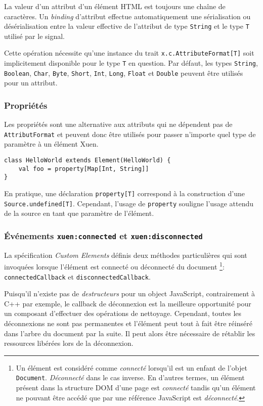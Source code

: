 La valeur d'un attribut d'un élément HTML est toujours une chaîne de caractères. Un \emph{binding} d'attribut effectue automatiquement une sérialisation ou désérialisation entre la valeur effective de l'attribut de type \texttt{String} et le type \texttt{T} utilisé par le signal.

Cette opération nécessite qu'une instance du trait \texttt{x.c.AttributeFormat[T]} soit implicitement disponible pour le type \texttt{T} en question. Par défaut, les types \texttt{String}, \texttt{Boolean}, \texttt{Char}, \texttt{Byte}, \texttt{Short}, \texttt{Int}, \texttt{Long}, \texttt{Float} et \texttt{Double} peuvent être utilisés pour un attribut.

\subsubsection{Propriétés}
Les propriétés sont une alternative aux attributs qui ne dépendent pas de \texttt{AttributFormat} et peuvent donc être utilisés pour passer n'importe quel type de paramètre à un élément Xuen. 

\begin{lstlisting}
class HelloWorld extends Element(HelloWorld) {
	val foo = property[Map[Int, String]]
}
\end{lstlisting}

En pratique, une déclaration \texttt{property[T]} correspond à la construction d'une \texttt{Source.undefined[T]}. Cependant, l'usage de \texttt{property} souligne l'usage attendu de la source en tant que paramètre de l'élément.

\subsubsection{Événements \texttt{xuen:connected} et \texttt{xuen:disconnected}}

La spécification \emph{Custom Elements} définis deux méthodes particulières qui sont invoquées lorsque l'élément est connecté ou déconnecté du document \footnote{Un élément est considéré comme \emph{connecté} lorsqu'il est un enfant de l'objet \texttt{Document}. \emph{Déconnecté} dans le cas inverse. En d'autres termes, un élément présent dans la structure DOM d'une page est \emph{connecté} tandis qu'un élément ne pouvant être accédé que par une référence JavaScript est \emph{déconnecté}.}: \texttt{connectedCallback} et \texttt{disconnectedCallback}.

Puisqu'il n'existe pas de \emph{destructeurs} pour un object JavaScript, contrairement à C++ par exemple, le callback de déconnexion est la meilleure opportunité pour un composant d'effectuer des opérations de nettoyage. Cependant, toutes les déconnexions ne sont pas permanentes et l'élément peut tout à fait être réinséré dans l'arbre du document par la suite. Il peut alors être nécessaire de rétablir les ressources libérées lors de la déconnexion.

